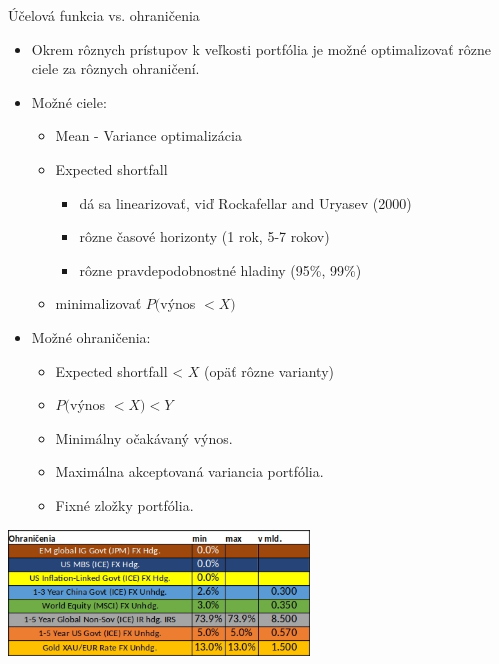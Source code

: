 \documentclass{Bredelebeamer}
\begin{document}
\begin{frame}{Účelová funkcia vs. ohraničenia}
	\begin{itemize}
		\item Okrem rôznych prístupov k veľkosti portfólia je možné optimalizovať rôzne ciele za rôznych ohraničení.
		\item Možné ciele:		
		\begin{itemize}
			\item Mean - Variance optimalizácia
			\item Expected shortfall
			\begin{itemize}
				\item dá sa linearizovať, viď Rockafellar and Uryasev (2000)
				\item rôzne časové horizonty (1 rok, 5-7 rokov)
				\item rôzne pravdepodobnostné hladiny (95\%, 99\%)
			\end{itemize}
			\item minimalizovať $P($výnos $<X)$
		\end{itemize}
		\pause\item Možné ohraničenia:
		\begin{itemize}
			\item Expected shortfall < $X$ (opäť rôzne varianty)
			\item $P($výnos $<X) < Y$
			\item Minimálny očakávaný výnos.
			\item Maximálna akceptovaná variancia portfólia.
			\item Fixné zložky portfólia.
		\end{itemize}
	\end{itemize}
	\centering
	\includegraphics[width=0.6\textwidth]{Figures/constraints}
\end{frame}
\end{document}
